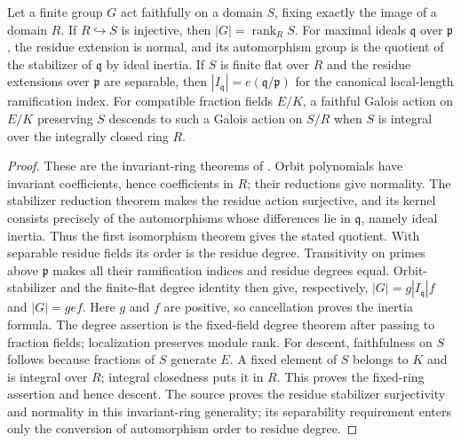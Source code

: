 \begin{theorem}
\label{fw:galois-ring-residue-theory}
\mathlibok
Let a finite group $G$ act faithfully on a domain $S$, fixing exactly
the image of a domain $R$. If $R\hookrightarrow S$ is injective, then
$|G|=\operatorname{rank}_R S$. For maximal ideals $\mathfrak q$ over $\mathfrak p$,
the residue extension is normal, and its automorphism group is the
quotient of the stabilizer of $\mathfrak q$ by ideal inertia.
If $S$ is finite flat over $R$ and the residue extensions over
$\mathfrak p$ are separable, then
$|I_{\mathfrak q}|=e(\mathfrak q/\mathfrak p)$ for the canonical
local-length ramification index.
For compatible fraction fields $E/K$, a faithful Galois action on
$E/K$ preserving $S$ descends to such a Galois action on $S/R$
when $S$ is integral over the integrally closed ring $R$.
\end{theorem}
\begin{proof}
These are the invariant-ring theorems of \cite{MathlibGaloisInertia}.
Orbit polynomials have invariant coefficients, hence coefficients in
$R$; their reductions give normality. The stabilizer reduction theorem
makes the residue action surjective, and its kernel consists precisely
of the automorphisms whose differences lie in $\mathfrak q$, namely
ideal inertia. Thus the first isomorphism theorem gives the stated
quotient. With separable residue fields its order is the residue
degree. Transitivity on primes above $\mathfrak p$ makes all their
ramification indices and residue degrees equal. Orbit-stabilizer and
the finite-flat degree identity then give, respectively,
$|G|=g|I_{\mathfrak q}|f$ and $|G|=gef$.
Here $g$ and $f$ are positive, so cancellation proves the inertia formula.
The degree assertion is the fixed-field degree theorem after passing to
fraction fields; localization preserves module rank.
For descent, faithfulness on $S$ follows because fractions of $S$
generate $E$. A fixed element of $S$ belongs to $K$ and is integral
over $R$; integral closedness puts it in $R$. This proves the fixed-ring
assertion and hence descent. The source proves the residue stabilizer
surjectivity and normality in this invariant-ring generality; its
separability requirement enters only the conversion of automorphism
order to residue degree.
\end{proof}

